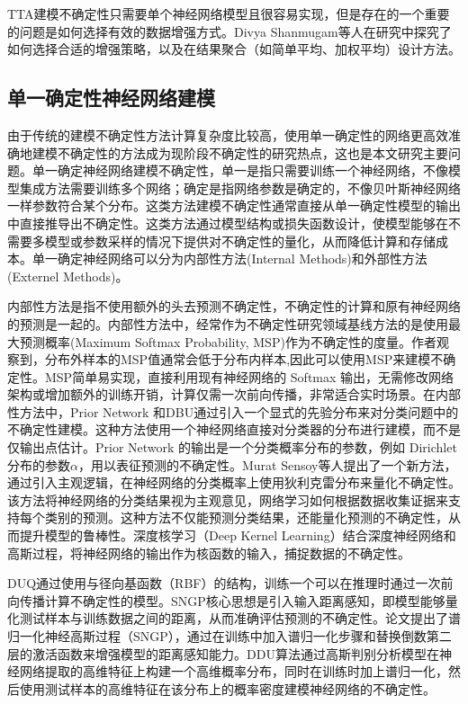 TTA建模不确定性只需要单个神经网络模型且很容易实现，但是存在的一个重要的问题是如何选择有效的数据增强方式。Divya Shanmugam等人\cite{shanmugam2020and}在研究中探究了如何选择合适的增强策略，以及在结果聚合（如简单平均、加权平均）设计方法。




\subsection{单一确定性神经网络建模}
由于传统的建模不确定性方法计算复杂度比较高，使用单一确定性的网络更高效准确地建模不确定性的方法成为现阶段不确定性的研究热点，这也是本文研究主要问题。单一确定神经网络建模不确定性，单一是指只需要训练一个神经网络，不像模型集成方法需要训练多个网络；确定是指网络参数是确定的，不像贝叶斯神经网络一样参数符合某个分布。这类方法建模不确定性通常直接从单一确定性模型的输出中直接推导出不确定性。这类方法通过模型结构或损失函数设计，使模型能够在不需要多模型或参数采样的情况下提供对不确定性的量化，从而降低计算和存储成本。单一确定神经网络可以分为内部性方法(Internal Methods)\cite{oala2020interval}和外部性方法(Externel Methods)\cite{gawlikowski2023survey}。

内部性方法是指不使用额外的头去预测不确定性，不确定性的计算和原有神经网络的预测是一起的。内部性方法中，经常作为不确定性研究领域基线方法的是使用最大预测概率\cite{hendrycks2017a}(Maximum Softmax Probability, MSP)作为不确定性的度量。作者观察到，分布外样本的MSP值通常会低于分布内样本,因此可以使用MSP来建模不确定性。MSP简单易实现，直接利用现有神经网络的 Softmax 输出，无需修改网络架构或增加额外的训练开销，计算仅需一次前向传播，非常适合实时场景。在内部性方法中，Prior Network\cite{malinin2018predictive} 和DBU\cite{kopetzki2021evaluating}通过引入一个显式的先验分布来对分类问题中的不确定性建模。这种方法使用一个神经网络直接对分类器的分布进行建模，而不是仅输出点估计。Prior Network 的输出是一个分类概率分布的参数，例如 Dirichlet 分布的参数$\alpha$，用以表征预测的不确定性。Murat Sensoy等人\cite{sensoy2018evidential}提出了一个新方法，通过引入主观逻辑，在神经网络的分类概率上使用狄利克雷分布来量化不确定性。该方法将神经网络的分类结果视为主观意见，网络学习如何根据数据收集证据来支持每个类别的预测。这种方法不仅能预测分类结果，还能量化预测的不确定性，从而提升模型的鲁棒性。深度核学习（Deep Kernel Learning）\cite{van2021feature}结合深度神经网络和高斯过程，将神经网络的输出作为核函数的输入，捕捉数据的不确定性。

DUQ\cite{van2020uncertainty}通过使用与径向基函数（RBF）的结构，训练一个可以在推理时通过一次前向传播计算不确定性的模型。SNGP\cite{liu2020simple}核心思想是引入输入距离感知，即模型能够量化测试样本与训练数据之间的距离，从而准确评估预测的不确定性。论文提出了谱归一化神经高斯过程（SNGP），通过在训练中加入谱归一化\cite{yoshida2017spectral}步骤和替换倒数第二层的激活函数来增强模型的距离感知能力。DDU算法\cite{Mukhoti_2023_CVPR}通过高斯判别分析模型在神经网络提取的高维特征上构建一个高维概率分布，同时在训练时加上谱归一化，然后使用测试样本的高维特征在该分布上的概率密度建模神经网络的不确定性。

